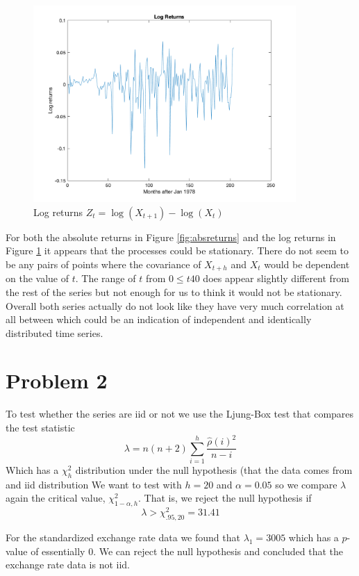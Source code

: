 \documentclass{article}
\begin{document}
\begin{figure}[H]
\includegraphics[width=10cm]{plots/log_returns.png}
\centering
\caption{Log returns $Z_t = \log(X_{t + 1}) - \log(X_{t})$}
\label{fig:logreturns}
\end{figure}

For both the absolute returns in Figure \ref{fig:absreturns} and the log returns in Figure \ref{fig:logreturns} it appears that the processes could be stationary.
There do not seem to be any pairs of points where the covariance of $X_{t + h}$ and $X_{t}$ would be dependent on the value of $t$.
The range of $t$ from $0 \leq t 40$ does appear slightly different from the rest of the series but not enough for us to think it would not be stationary.
Overall both series actually do not look like they have very much correlation at all between which could be an indication of independent and identically distributed time series.

\section*{Problem 2}
To test whether the series are iid or not we use the Ljung-Box test that compares the test statistic
$$
\lambda = n (n + 2) \sum_{i = 1}^h \frac{\hat{\rho}(i)^2}{n - i}
$$
Which has a $\chi^2_{h}$ distribution under the null hypothesis (that the data comes from and iid distribution
We want to test with $h = 20$ and $\alpha = 0.05$ so we compare $\lambda$ again the critical value, $\chi^2_{1-\alpha,h}$. That is, we reject the null hypothesis if
$$
\lambda > \chi^2_{.95,20} = 31.41
$$

For the standardized exchange rate data we found that $\lambda_1 = 3005$ which has a $p$-value of essentially 0. We can reject the null hypothesis and concluded that the exchange rate data is not iid.
\end{document}
